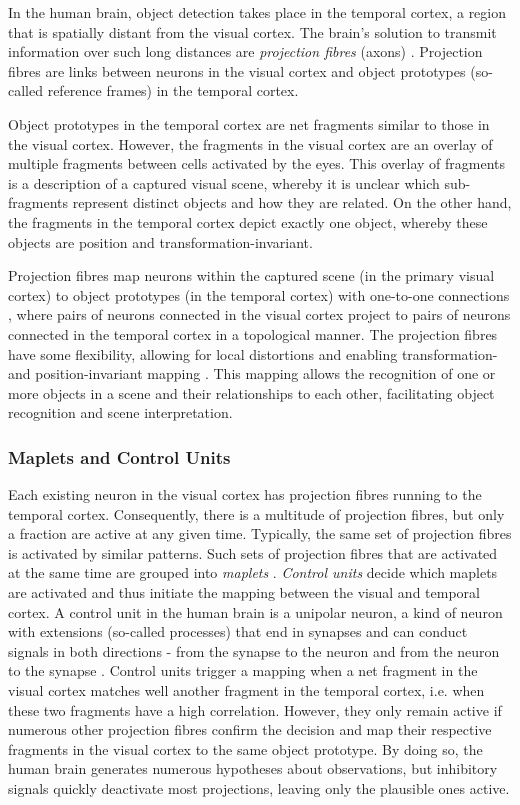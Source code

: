 In the human brain, object detection takes place in the temporal cortex, a region that is spatially distant from the visual cortex.
The brain's solution to transmit information over such long distances are \emph{projection fibres} (axons) .
Projection fibres are links between neurons in the visual cortex and object prototypes (so-called reference frames) in the temporal cortex.

Object prototypes in the temporal cortex are net fragments similar to those in the visual cortex. However, the fragments in the visual cortex are an overlay of multiple fragments between cells activated by the eyes.
This overlay of fragments is a description of a captured visual scene, whereby it is unclear which sub-fragments represent distinct objects and how they are related.
On the other hand, the fragments in the temporal cortex depict exactly one object, whereby these objects are position and transformation-invariant.

Projection fibres map neurons within the captured scene (in the primary visual cortex) to object prototypes (in the temporal cortex) with one-to-one connections , where pairs of neurons connected in the visual cortex project to pairs of neurons connected in the temporal cortex in a topological manner. The projection fibres have some flexibility, allowing for local distortions and enabling transformation- and position-invariant mapping . This mapping allows the recognition of one or more objects in a scene and their relationships to each other, facilitating object recognition and scene interpretation.

\subsubsection{Maplets and Control Units}
Each existing neuron in the visual cortex has projection fibres running to the temporal cortex. Consequently, there is a multitude of projection fibres, but only a fraction are active at any given time.
Typically, the same set of projection fibres is activated by similar patterns.
Such sets of projection fibres that are activated at the same time are grouped into \emph{maplets} .
\emph{Control units} decide which maplets are activated and thus initiate the mapping between the visual and temporal cortex. 
A control unit in the human brain is a unipolar neuron, a kind of neuron with extensions (so-called processes) that end in synapses and can conduct signals in both directions - from the synapse to the neuron and from the neuron to the synapse .
Control units trigger a mapping when a net fragment in the visual cortex matches well another fragment in the temporal cortex, i.e. when these two fragments have a high correlation. However, they only remain active if numerous other projection fibres confirm the decision and map their respective fragments in the visual cortex to the same object prototype. By doing so, the human brain generates numerous hypotheses about observations, but inhibitory signals quickly deactivate most projections, leaving only the plausible ones active.

